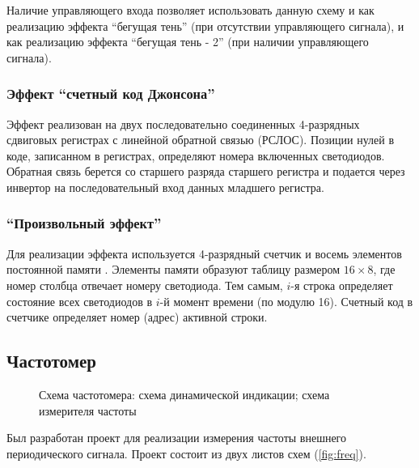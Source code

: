 Наличие управляющего входа позволяет использовать данную схему и как реализацию эффекта \enquote{бегущая тень} (при отсутствии управляющего сигнала), и как реализацию эффекта \enquote{бегущая тень - 2} (при наличии управляющего сигнала).

\subsubsection{Эффект \enquote{счетный код Джонсона}}

Эффект реализован на двух последовательно соединенных 4-разрядных сдвиговых регистрах с линейной обратной связью (РСЛОС). Позиции нулей в коде, записанном в регистрах, определяют номера включенных светодиодов. Обратная связь берется со старшего разряда старшего регистра и подается через инвертор на последовательный вход данных младшего регистра.

\subsubsection{\enquote{Произвольный эффект}}

Для реализации эффекта используется 4-разрядный счетчик и восемь элементов постоянной памяти . Элементы памяти образуют таблицу размером $16 \times 8$, где номер столбца отвечает номеру светодиода. Тем самым, $i$-я строка определяет состояние всех светодиодов в $i$-й момент времени (по модулю 16). Счетный код в счетчике определяет номер (адрес) активной строки.

\subsection{Частотомер}

\begin{figure}[h]%
\centering
%
%
\hspace{8pt}%
%
%
\hspace{8pt}%
%
\caption[Схема частотомера.]{Схема частотомера:
 схема динамической индикации; %
 схема измерителя частоты} %
\label{fig:freq}%
\end{figure}

Был разработан проект для реализации измерения частоты внешнего периодического сигнала. Проект состоит из двух листов схем (\autoref{fig:freq}).

